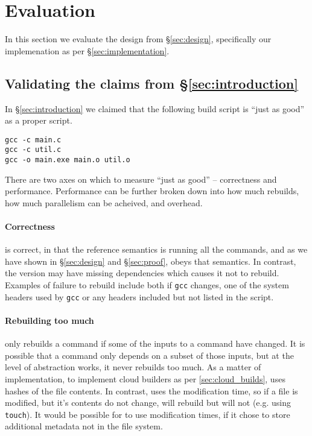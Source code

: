 \section{Evaluation}
\label{sec:evaluation}

In this section we evaluate the design from \S\ref{sec:design}, specifically our implemenation as per \S\ref{sec:implementation}.

\subsection{Validating the claims from \S\ref{sec:introduction}}

In \S\ref{sec:introduction} we claimed that the following build script is ``just as good'' as a proper \Make script.

\begin{verbatim}
gcc -c main.c
gcc -c util.c
gcc -o main.exe main.o util.o
\end{verbatim}

There are two axes on which to measure ``just as good'' -- correctness and performance. Performance can be further broken down into how much rebuilds, how much parallelism can be acheived, and overhead.

\paragraph{Correctness} \Rattle is correct, in that the reference semantics is running all the commands, and as we have shown in \S\ref{sec:design} and \S\ref{sec:proof}, \Rattle obeys that semantics. In contrast, the \Make version may have missing dependencies which causes it not to rebuild. Examples of failure to rebuild include both if \texttt{gcc} changes, one of the system headers used by \texttt{gcc} or any headers included but not listed in the \Make script.

\paragraph{Rebuilding too much} \Rattle only rebuilds a command if some of the inputs to a command have changed. It is possible that a command only depends on a subset of those inputs, but at the level of abstraction \Rattle works, it never rebuilds too much. As a matter of implementation, to implement cloud builders as per \ref{sec:cloud_builds}, \Rattle uses hashes of the file contents. In contrast, \Make uses the modification time, so if a file is modified, but it's contents do not change, \Make will rebuild but \Rattle will not (e.g. using \texttt{touch}). It would be possible for \Make to use modification times, if it chose to store additional metadata not in the file system.

